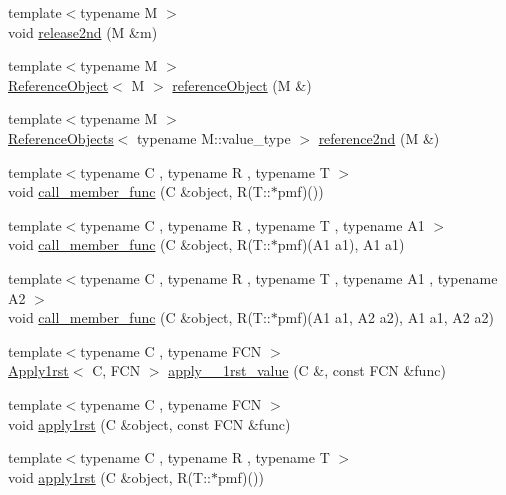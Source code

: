 \begin{DoxyCompactItemize}
\item 
{\footnotesize template$<$typename M $>$ }\\void \hyperlink{namespace_d_d4hep_a3e387f4e7a1b1ab9e3b4647609b2cee3}{release2nd} (M \&m)
\item 
{\footnotesize template$<$typename M $>$ }\\\hyperlink{class_d_d4hep_1_1_reference_object}{ReferenceObject}$<$ M $>$ \hyperlink{namespace_d_d4hep_ac8e230023dd6b6ca09de62f3c708e28f}{referenceObject} (M \&)
\item 
{\footnotesize template$<$typename M $>$ }\\\hyperlink{class_d_d4hep_1_1_reference_objects}{ReferenceObjects}$<$ typename M::value\_\-type $>$ \hyperlink{namespace_d_d4hep_ab09403d5ba66107d7e7af6952f6580bf}{reference2nd} (M \&)
\item 
{\footnotesize template$<$typename C , typename R , typename T $>$ }\\void \hyperlink{namespace_d_d4hep_ac90890d501a808e24d23764f30b12d4a}{call\_\-member\_\-func} (C \&object, R(T::$\ast$pmf)())
\item 
{\footnotesize template$<$typename C , typename R , typename T , typename A1 $>$ }\\void \hyperlink{namespace_d_d4hep_ac8658f9383f577e756131df133817f9f}{call\_\-member\_\-func} (C \&object, R(T::$\ast$pmf)(A1 a1), A1 a1)
\item 
{\footnotesize template$<$typename C , typename R , typename T , typename A1 , typename A2 $>$ }\\void \hyperlink{namespace_d_d4hep_ad6f8e017a88c5eb91e10497ca54035ed}{call\_\-member\_\-func} (C \&object, R(T::$\ast$pmf)(A1 a1, A2 a2), A1 a1, A2 a2)
\item 
{\footnotesize template$<$typename C , typename FCN $>$ }\\\hyperlink{class_d_d4hep_1_1_apply1rst}{Apply1rst}$<$ C, FCN $>$ \hyperlink{namespace_d_d4hep_a22e8e99463908c856fb454c15bc7ab17}{apply\_\-\_\-1rst\_\-value} (C \&, const FCN \&func)
\item 
{\footnotesize template$<$typename C , typename FCN $>$ }\\void \hyperlink{namespace_d_d4hep_ad57af591165d8b8d820fe80029157e18}{apply1rst} (C \&object, const FCN \&func)
\item 
{\footnotesize template$<$typename C , typename R , typename T $>$ }\\void \hyperlink{namespace_d_d4hep_a7b470d25c1c3c50b01353866d4df45b8}{apply1rst} (C \&object, R(T::$\ast$pmf)())

\end{DoxyCompactItemize}
